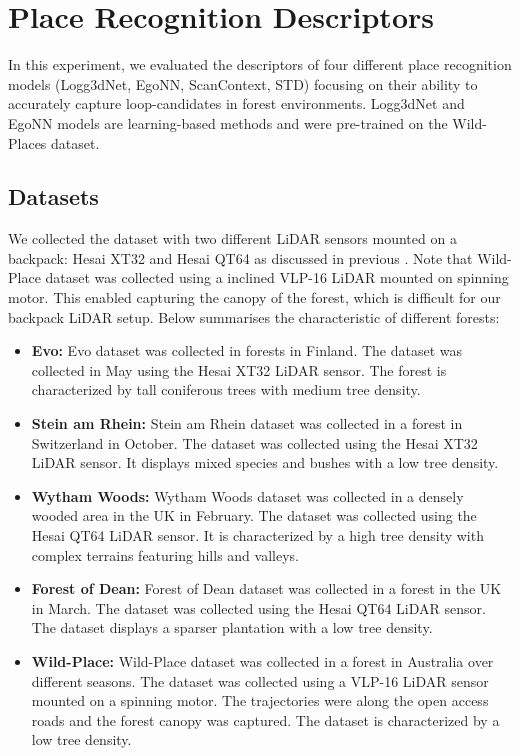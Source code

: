 \section{Place Recognition Descriptors}
\label{sec:exp_desc_analysis} 
In this experiment, we evaluated the descriptors of four different place recognition models (Logg3dNet, EgoNN, ScanContext, STD) focusing on their ability to accurately capture loop-candidates in forest environments. Logg3dNet and EgoNN models are learning-based methods and were pre-trained on the Wild-Places dataset. 
\subsection*{Datasets}
We collected the dataset with two different LiDAR sensors mounted on a backpack: Hesai XT32 and Hesai QT64  as discussed in previous . Note that Wild-Place\cite{knights2023icra} dataset was collected using a inclined VLP-16 LiDAR mounted on spinning motor. This enabled capturing the canopy of the forest, which is difficult for our backpack LiDAR setup. Below summarises the characteristic of different forests:
\begin{itemize}
  \item \textbf{Evo:} Evo dataset was collected in forests in Finland. The dataset was collected in May using the Hesai XT32 LiDAR sensor. The forest is characterized by tall coniferous trees with medium tree density.
  
  \item \textbf{Stein am Rhein:} Stein am Rhein dataset was collected in a forest in Switzerland in October. The dataset was collected using the Hesai XT32 LiDAR sensor. It displays mixed species and bushes with a low tree density.   

  \item \textbf{Wytham Woods:} Wytham Woods dataset was collected in a densely wooded area in the UK in February. The dataset was collected using the Hesai QT64 LiDAR sensor. It is characterized by a high tree density with complex terrains featuring hills and valleys.
  
  \item \textbf{Forest of Dean:} Forest of Dean dataset was collected in a forest in the UK in March. The dataset was collected using the Hesai QT64 LiDAR sensor. The dataset displays a sparser plantation with a low tree density. 

  \item \textbf{Wild-Place:} Wild-Place dataset was collected in a forest in Australia over different seasons. The dataset was collected using a VLP-16 LiDAR sensor mounted on a spinning motor. The trajectories were along the open access roads and the forest canopy was captured. The dataset is characterized by a low tree density.  
\end{itemize}

